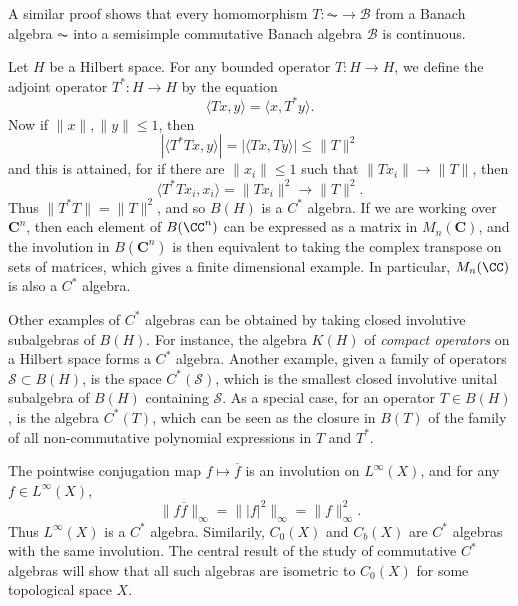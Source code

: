 \begin{remark}
    A similar proof shows that every homomorphism $T: \AC \to \mathcal{B}$ from a Banach algebra $\AC$ into a semisimple commutative Banach algebra $\mathcal{B}$ is continuous.
\end{remark}

\begin{example}
    Let $H$ be a Hilbert space. For any bounded operator $T: H \to H$, we define the adjoint operator $T^*: H \to H$ by the equation
    \[ \langle Tx, y \rangle = \langle x, T^* y \rangle. \]
    Now if $\| x \|, \| y \| \leq 1$, then
    \[ | \langle T^* T x, y \rangle | = | \langle Tx, Ty \rangle | \leq \| T \|^2 \]
    and this is attained, for if there are $\| x_i \| \leq 1$ such that $\| Tx_i \| \to \| T \|$, then
    \[ \langle T^* T x_i, x_i \rangle = \| Tx_i \|^2 \to \| T \|^2. \]
    Thus $\| T^* T \| = \| T \|^2$, and so $B(H)$ is a $C^*$ algebra. If we are working over $\mathbf{C}^n$, then each element of $B(\CC^n)$ can be expressed as a matrix in $M_n(\mathbf{C})$, and the involution in $B(\mathbf{C}^n)$ is then equivalent to taking the complex transpose on sets of matrices, which gives a finite dimensional example. In particular, $M_n(\CC)$ is also a $C^*$ algebra.
\end{example}

\begin{example}
    Other examples of $C^*$ algebras can be obtained by taking closed involutive subalgebras of $B(H)$. For instance, the algebra $K(H)$ of \emph{compact operators} on a Hilbert space forms a $C^*$ algebra. Another example, given a family of operators $\mathcal{S} \subset B(H)$, is the space $C^*(\mathcal{S})$, which is the smallest closed involutive unital subalgebra of $B(H)$ containing $\mathcal{S}$. As a special case, for an operator $T \in B(H)$, is the algebra $C^*(T)$, which can be seen as the closure in $B(T)$ of the family of all non-commutative polynomial expressions in $T$ and $T^*$.
\end{example}

\begin{example}
    The pointwise conjugation map $f \mapsto \overline{f}$ is an involution on $L^\infty(X)$, and for any $f \in L^\infty(X)$,
    \[ \| f \overline{f} \|_\infty = \| |f|^2 \|_\infty = \| f \|^2_\infty. \]
    Thus $L^\infty(X)$ is a $C^*$ algebra. Similarily, $C_0(X)$ and $C_b(X)$ are $C^*$ algebras with the same involution. The central result of the study of commutative $C^*$ algebras will show that all such algebras are isometric to $C_0(X)$ for some topological space $X$.
\end{example}

